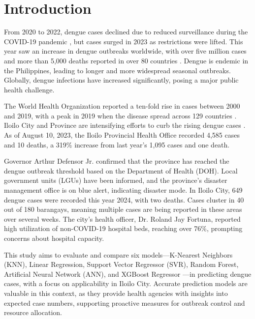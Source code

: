 \documentclass[runningheads]{llncs}
\begin{document}
\section{Introduction}

From 2020 to 2022, dengue cases declined due to reduced surveillance during the COVID-19 pandemic \cite{WHO2023}, but cases surged in 2023 as restrictions were lifted. This year saw an increase in dengue outbreaks worldwide, with over five million cases and more than 5,000 deaths reported in over 80 countries \cite{bosano2023who}. Dengue is endemic in the Philippines, leading to longer and more widespread seasonal outbreaks. Globally, dengue infections have increased significantly, posing a major public health challenge. 

The World Health Organization reported a ten-fold rise in cases between 2000 and 2019, with a peak in 2019 when the disease spread across 129 countries \cite{WHO2024}. Iloilo City and Province are intensifying efforts to curb the rising dengue cases \cite{lena2024}. As of August 10, 2023, the Iloilo Provincial Health Office recorded 4,585 cases and 10 deaths, a 319\% increase from last year’s 1,095 cases and one death. 

Governor Arthur Defensor Jr. confirmed that the province has reached the dengue outbreak threshold based on the Department of Health (DOH). Local government units (LGUs) have been informed, and the province’s disaster management office is on blue alert, indicating disaster mode. \cite{PNA2024} In Iloilo City, 649 dengue cases were recorded this year 2024, with two deaths. Cases cluster in 40 out of 180 barangays, meaning multiple cases are being reported in these areas over several weeks. The city’s health officer, Dr. Roland Jay Fortuna, reported high utilization of non-COVID-19 hospital beds, reaching over 76\%, prompting concerns about hospital capacity. 

This study aims to evaluate and compare six models—K-Nearest Neighbors (KNN), Linear Regression, Support Vector Regressor (SVR), Random Forest, Artificial Neural Network (ANN), and XGBoost Regressor  —in predicting dengue cases, with a focus on applicability in Iloilo City. Accurate prediction models are valuable in this context, as they provide health agencies with insights into expected case numbers, supporting proactive measures for outbreak control and resource allocation.
\end{document}
